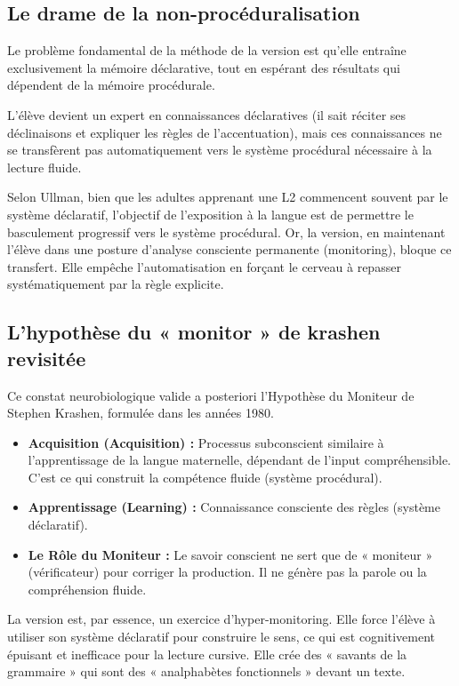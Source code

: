 \subsection{Le drame de la non-procéduralisation}

Le problème fondamental de la méthode de la version est qu'elle entraîne exclusivement la mémoire
déclarative, tout en espérant des résultats qui dépendent de la mémoire procédurale.

L'élève devient un expert en connaissances déclaratives (il sait réciter ses déclinaisons et
expliquer les règles de l'accentuation), mais ces connaissances ne se transfèrent pas
automatiquement vers le système procédural nécessaire à la lecture fluide.\cite{II-3-1-ref45}

Selon Ullman, bien que les adultes apprenant une L2 commencent souvent par le système déclaratif,
l'objectif de l'exposition à la langue est de permettre le basculement progressif vers le système
procédural.\cite{II-3-1-ref47} Or, la version, en maintenant l'élève dans une posture d'analyse
consciente permanente (monitoring), bloque ce transfert. Elle empêche l'automatisation en forçant le
cerveau à repasser systématiquement par la règle explicite.\cite{II-3-1-ref48}



\subsection{L'hypothèse du « monitor » de krashen revisitée}

Ce constat neurobiologique valide a posteriori l'Hypothèse du Moniteur de Stephen Krashen, formulée
dans les années 1980.\cite{II-3-1-ref48}

\begin{itemize}\item \textbf{Acquisition (Acquisition) :} Processus subconscient similaire à l'apprentissage de la langue maternelle, dépendant de l'input compréhensible. C'est ce qui construit la compétence fluide (système procédural).\item \textbf{Apprentissage (Learning) :} Connaissance consciente des règles (système déclaratif).\item \textbf{Le Rôle du Moniteur :} Le savoir conscient ne sert que de « moniteur » (vérificateur) pour corriger la production. Il ne génère pas la parole ou la compréhension fluide.\end{itemize}La version est, par essence, un exercice d'hyper-monitoring. Elle force l'élève à utiliser son
système déclaratif pour construire le sens, ce qui est cognitivement épuisant et inefficace pour la
lecture cursive. Elle crée des « savants de la grammaire » qui sont des « analphabètes fonctionnels
» devant un texte.\cite{II-3-1-ref51}

